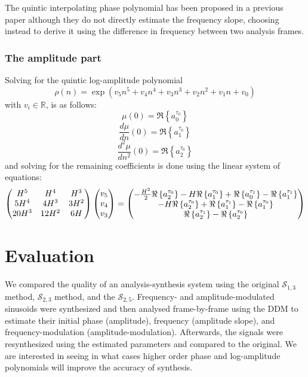 The quintic interpolating phase polynomial has been proposed in a previous paper
\cite{girin2003comparing} although they do not directly estimate the frequency
slope, choosing instead to derive it using the difference in frequency between
two analysis frames.

\subsubsection{The amplitude part}

Solving for the quintic log-amplitude polynomial
\begin{equation}
    \label{eq:quinticamppoly}
    \rho(n) = \exp \left(v_5 n^{5} + v_4 n^{4} + v_3 n^{3} + v_2 n^{2} + v_1 n + v_0 \right)
\end{equation}
with $v_i \in \mathbb{R}$, is as follows:
\[
    \mu(0) = \Re \left\{ a^{\tau_0}_0 \right\}
\]
\[
    \frac{d \mu}{d n}(0) = \Re \left\{ a^{\tau_0}_1 \right\}
\]
\[
    \frac{d^{2} \mu}{d n^{2}}(0) = \Re \left\{ a^{\tau_0}_2 \right\}
\]
and solving for the remaining coefficients is done using the linear system of
equations:
\[
    \begin{pmatrix}
        H^5 & H^4 & H^3 \\
        5 H^4 & 4 H^3 & 3 H^2 \\
        20 H^3 & 12 H^2 & 6 H
    \end{pmatrix}
    \begin{pmatrix}
        v_5 \\
        v_4 \\
        v_3
    \end{pmatrix}
    =
    \begin{pmatrix}
        -\frac{ H^{2} }{2} \Re \left\{  a^{\tau_0}_2  \right\} - H \Re \left\{  a^{\tau_0}_1  \right\} +
            \Re \left\{  a^{\tau_1}_0  \right\} - \Re \left\{  a^{\tau_1}_1  \right\} \\
        -H \Re \left\{  a^{\tau_0}_2  \right\} + \Re \left\{  a^{\tau_1}_1  \right\} - \Re \left\{  a^{\tau_0}_1  \right\} \\
        \Re \left\{  a^{\tau_1}_2  \right\} - \Re \left\{  a^{\tau_0}_2  \right\}
    \end{pmatrix}
\]

\section{Evaluation}

We compared the quality of an analysis-synthesis system using the original
$\mathscr{S}_{1,3}$ method, $\mathscr{S}_{2,3}$ method, and the
$\mathscr{S}_{2,5}$. Frequency- and amplitude-modulated sinusoids were
synthesized and then analysed frame-by-frame using the DDM to estimate their
initial phase (amplitude), frequency (amplitude slope), and frequency-modulation
(amplitude-modulation). Afterwards, the signals were resynthesized using the
estimated parameters and compared to the original.  We are interested in seeing
in what cases higher order phase and log-amplitude polynomials will improve the accuracy of
synthesis.

